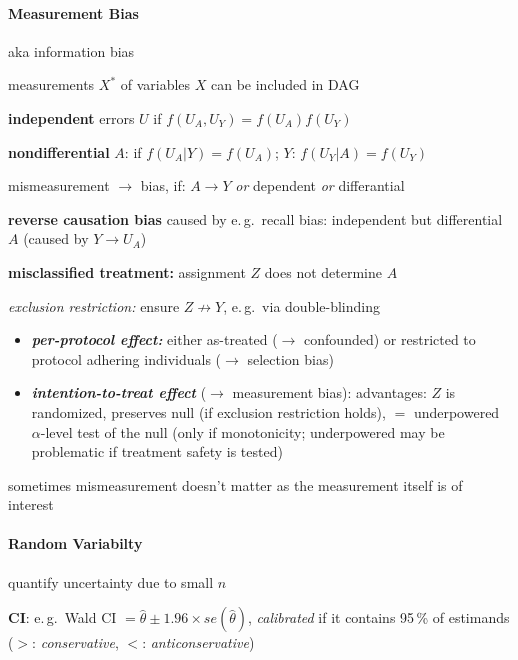 \documentclass[8pt,twoside]{extarticle}
\begin{document}
\begin{multicols}{2}
\paragraph{Measurement Bias} aka information bias 

 measurements $X^*$ of variables $X$ can be included in DAG

 \textbf{independent} errors $U$ if $f(U_A, U_Y) = f(U_A)f(U_Y)$

 \textbf{nondifferential} $A$:  if $f(U_A|Y)=f(U_A)$; $Y$: $f(U_Y|A)=f(U_Y)$

 mismeasurement $\to$ bias, if: $A\to Y$ \textit{or} dependent \textit{or} differantial

 \textbf{reverse causation bias} caused by e.\,g.\ recall bias: independent but differential $A$ (caused by $Y \to U_A$)


 \textbf{misclassified treatment:} assignment $Z$ does not determine $A$

 \textit{exclusion restriction:} ensure  $Z\not\to Y$, e.\,g.\ via double-blinding



\begin{itemize}[itemsep=0em, topsep=0pt, partopsep=0pt,parsep=0pt, leftmargin=1.5em]
\setlength{\itemsep}{0pt}%
\setlength{\parskip}{0pt}
\item \textit{\textbf{per-protocol effect:}} either as-treated ($\to$ confounded) or restricted to protocol adhering individuals ($\to$ selection bias)
\item \textit{\textbf{intention-to-treat effect}} ($\to$ measurement bias): advantages: $Z$ is randomized, preserves null (if exclusion restriction holds), $=$ underpowered $\alpha$-level test of the null (only if monotonicity; underpowered may be problematic if treatment safety is tested)
\end{itemize}


 sometimes mismeasurement doesn't matter as the measurement itself
 is of interest \citep{hernan2023causal}






\paragraph{Random Variabilty}  quantify uncertainty due to small $n$

 \textbf{CI}: e.\,g.\ Wald CI $=\hat{\theta} \pm 1.96 \times se(\hat{\theta})$, \textit{calibrated} if it contains 95\,\% of estimands ($>$: \textit{conservative}, $<$: \textit{anticonservative})


\end{multicols}
\end{document}
